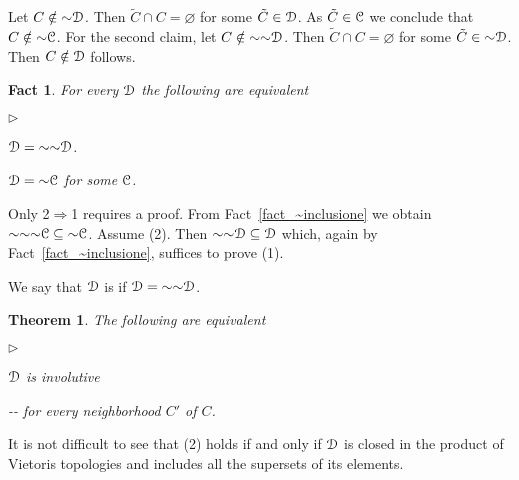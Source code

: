 \documentclass{amsproc}
\makeatletter
\newcommand{\mylabel}[1]{{#1}\hfill}
\renewenvironment{itemize}
  {\begin{list}{$\triangleright$}{%
  \setlength{\parskip}{0mm}
  \setlength{\topsep}{.1\baselineskip}
  \setlength{\rightmargin}{0mm}
  \setlength{\listparindent}{0mm}
  \setlength{\itemindent}{0mm}
  \setlength{\labelwidth}{3ex}
  \setlength{\itemsep}{.1\baselineskip}
  \setlength{\parsep}{.1\baselineskip}
  \setlength{\partopsep}{0mm}
  \setlength{\labelsep}{1ex}
  \setlength{\leftmargin}{\labelwidth+\labelsep}
  \let\makelabel\mylabel}}{%
\end{list}}
\newcounter{thm}
\theoremstyle{mio}
\newtheorem{theorem}[thm]{Theorem}\tcolorboxenvironment{theorem}{mythm}
\newtheorem{fact}[thm]{Fact}\tcolorboxenvironment{fact}{mythm}
\providecommand{\proofNameStyle}{\bfseries}
\renewenvironment{proof}[1][\proofname]{\par
  \pushQED{\qed}%
  \normalfont%
  \trivlist
  \item[\hskip\labelsep
        \proofNameStyle
    #1\@addpunct{.}]\ignorespaces
}{%
  \popQED\endtrivlist\@endpefalse
}
\renewcommand*{\emph}[1]{%
   \smash{\tikz[baseline]\node[rectangle, fill=teal!25, rounded corners, inner xsep=0.5ex, inner ysep=0.2ex, anchor=base, minimum height = 2.7ex]{\strut #1};}}
\makeatother
\begin{document}
\begin{proof}
  Let $C\notin{\sim}{\EuScript D}$.
  Then $\tilde C\cap C=\varnothing$ for some $\tilde C\in{\EuScript D}$.
  As  $\tilde C\in{\EuScript C}$ we conclude that  $C\notin{\sim}{\EuScript C}$.
  For the second claim, let $C\notin{\sim}{\sim}{\EuScript D}$.
  Then $\tilde C\cap C=\varnothing$ for some $\tilde C\in{\sim}{\EuScript D}$.
  Then $C\notin{\EuScript D}$ follows.
\end{proof}

\begin{fact}
  For every ${\EuScript D}$ the following are equivalent
  \begin{itemize}
    \item [1.] ${\EuScript D}={\sim}{\sim}{\EuScript D}$.
    \item [2.] ${\EuScript D}={\sim}{\EuScript C}$ for some ${\EuScript C}$.
  \end{itemize}
\end{fact}
  
\begin{proof}
  Only 2$\Rightarrow$1 requires a proof.
  From Fact~\ref{fact_~inclusione} we obtain ${\sim}{\sim}{\sim}{\EuScript C}\subseteq{\sim}{\EuScript C}$.
  Assume (2).
  Then ${\sim}{\sim}{\EuScript D}\subseteq{\EuScript D}$ which, again by Fact~\ref{fact_~inclusione}, suffices to prove (1).
\end{proof}

We say that ${\EuScript D}$ is \emph{involutive\/} if ${\EuScript D}={\sim}{\sim}{\EuScript D}$.

\begin{theorem}
  The following are equivalent
  \begin{itemize}
    \item [1.] ${\EuScript D}$ is involutive 
    \item [2.] \noindent\kern-\kern-
     for every neighborhood $C'$ of $C$.
  \end{itemize}
\end{theorem}

It is not difficult to see that (2) holds if and only if ${\EuScript D}$ is closed in the product of Vietoris topologies and includes all the supersets of its elements.
\end{document}

